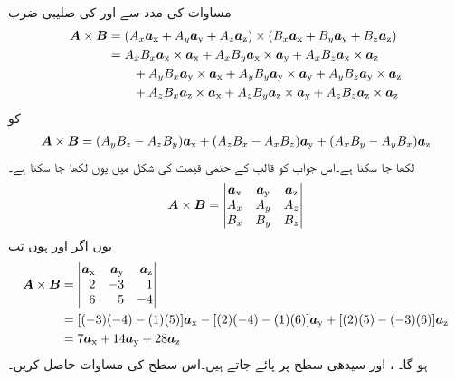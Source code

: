 مساوات  کی  مدد سے  اور  کی صلیبی ضرب
\begin{align*}
\kvec{A} \times \kvec{B}&=(A_x\ax+A_y\ay+A_z\az) \times (B_x\ax+B_y\ay+B_z\az)\\
&=A_x B_x \ax \times \ax+A_x B_y \ax \times \ay+A_x B_z \ax \times \az\\
& \quad \quad +A_y B_x \ay \times \ax+A_y B_y \ay \times \ay+A_y B_z \ay \times \az \\
&\quad \quad +A_z B_x \az \times \ax+A_z B_y \az \times \ay+A_z B_z \az \times \az
\end{align*}
کو
\begin{align}
\kvec{A} \times \kvec{B}=(A_y B_z-A_z B_y)\ax+(A_z B_x-A_x B_z)\ay+(A_x B_y-A_y B_x)\az
\end{align}
لکھا جا سکتا ہے۔اس جواب کو قالب کے حتمی قیمت کی شکل میں یوں لکھا جا سکتا ہے۔
\begin{align}\label{مساوات_سمتیات_سمتی_ضرب_قالب_شکل}
\kvec{A} \times \kvec{B}=\begin{vmatrix}
\ax & \ay & \az\\
A_x & A_y & A_z\\
B_x & B_y & B_z
\end{vmatrix}
\end{align}
یوں اگر  اور  ہوں تب
\begin{align*}
\kvec{A} \times \kvec{B}&=\begin{vmatrix*}[r]
\ax & \ay & \az\\
2 & -3 & 1\\
6 & 5 & -4
\end{vmatrix*}\\
&=[(-3)(-4)-(1)(5)]\ax-[(2)(-4)-(1)(6)]\ay+[(2)(5)-(-3)(6)]\az\\
&=7\ax+14\ay+28\az
\end{align*}
ہو گا۔
،  اور  سیدھی سطح پر پائے جاتے ہیں۔اس سطح کی مساوات حاصل کریں۔

